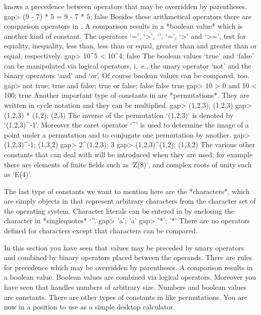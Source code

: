 {\GAP}  knows a  precedence  between operators that may be overridden  by
parentheses.
\beginexample
gap> (9 - 7) * 5 = 9 - 7  * 5;
false 
\endexample
Besides these  arithmetical  operators there are comparison  operators in
{\GAP}. A comparison  results in a *boolean value*  which is another kind
of constant.  The operators  `=', `\<>', `\<',  `\<=', `>' and `>=', test
for equality, inequality, less than, less than or equal, greater than and
greater than or equal, respectively.
\beginexample
gap> 10^5 < 10^4;
false 
\endexample
The boolean values  `true' and   `false'  can be  manipulated via logical
operators, i.~e., the unary operator `not' and the binary operators `and'
and `or'.  Of course boolean values can be compared, too.
\beginexample
gap> not true; true and false; true or false;
false
false
true
gap> 10 > 0 and 10 < 100;
true 
\endexample
Another important  type of constants in   {\GAP} are *permutations*. They
are written in cycle notation and they can be multiplied.
\beginexample
gap> (1,2,3);
(1,2,3)
gap> (1,2,3) * (1,2);
(2,3) 
\endexample
The inverse of the   permutation  `(1,2,3)' is denoted   by `(1,2,3)^-1'.
Moreover the caret operator `^' is used to determine the image of a point
under a permutation and to conjugate one permutation by another.
\beginexample
gap> (1,2,3)^-1;
(1,3,2)
gap> 2^(1,2,3);
3
gap> (1,2,3)^(1,2);
(1,3,2) 
\endexample
The various other constants that {\GAP} can deal with will be introduced
when they are used, for example there are elements of finite fields
such as `Z(8)', and complex roots of unity such as `E(4)'.

The    last  type  of   constants  we  want  to mention    here are the
*characters*, which are simply objects in {\GAP} that represent arbitrary
characters  from  the character set   of the  operating system. Character
literals can  be  entered   in  {\GAP} by  enclosing  the   character  in
*singlequotes* `{'}'.
\beginexample
gap> 'a';
'a'
gap> '*';
'*' 
\endexample
There are no  operators defined for characters except that characters can
be compared.

In this  section you  have  seen that values  may  be preceded  by  unary
operators  and combined by  binary operators placed between the operands.
There are rules for precedence which may be overridden by parentheses.  A
comparison  results in a boolean value.   Boolean values are combined via
logical operators.  Moreover you have seen that {\GAP} handles numbers of
arbitrary size.   Numbers and boolean   values are constants.   There are
other types of  constants in {\GAP} like permutations.   You are now in a
position to use {\GAP} as a simple desktop calculator.


